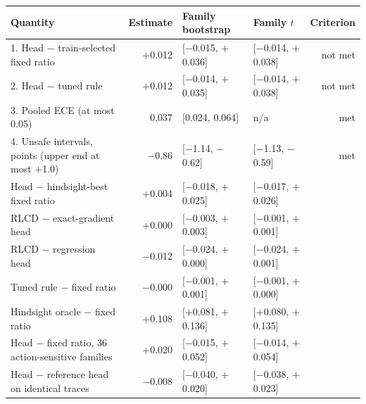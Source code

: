 \begin{tabular}{lrllr}
\toprule
Quantity & Estimate & Family bootstrap & Family $t$ & Criterion \\
\midrule
1. Head $-$ train-selected fixed ratio & $+$0.012 & [$-$0.015, $+$0.036] & [$-$0.014, $+$0.038] & not met \\
2. Head $-$ tuned rule & $+$0.012 & [$-$0.014, $+$0.035] & [$-$0.014, $+$0.038] & not met \\
3. Pooled ECE (at most 0.05) & 0.037 & [0.024, 0.064] & n/a & met \\
4. Unsafe intervals, points (upper end at most $+$1.0) & $-$0.86 & [$-$1.14, $-$0.62] & [$-$1.13, $-$0.59] & met \\
\midrule
Head $-$ hindsight-best fixed ratio & $+$0.004 & [$-$0.018, $+$0.025] & [$-$0.017, $+$0.026] &  \\
RLCD $-$ exact-gradient head & $+$0.000 & [$-$0.003, $+$0.003] & [$-$0.001, $+$0.001] &  \\
RLCD $-$ regression head & $-$0.012 & [$-$0.024, $+$0.000] & [$-$0.024, $+$0.001] &  \\
Tuned rule $-$ fixed ratio & $-$0.000 & [$-$0.001, $+$0.001] & [$-$0.001, $+$0.000] &  \\
Hindsight oracle $-$ fixed ratio & $+$0.108 & [$+$0.081, $+$0.136] & [$+$0.080, $+$0.135] &  \\
Head $-$ fixed ratio, 36 action-sensitive families & $+$0.020 & [$-$0.015, $+$0.052] & [$-$0.014, $+$0.054] &  \\
Head $-$ reference head on identical traces & $-$0.008 & [$-$0.040, $+$0.020] & [$-$0.038, $+$0.023] &  \\
\bottomrule
\end{tabular}
